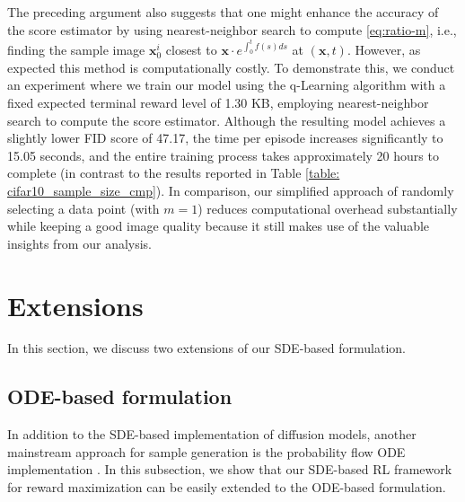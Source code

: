 \documentclass[11pt]{article}
\begin{document}
 The preceding argument also suggests that one might enhance the accuracy of the score estimator  by using nearest-neighbor search to compute \eqref{eq:ratio-m}, i.e., finding the sample image $\mathbf{x}^i_{0}$ closest to $\mathbf{x} \cdot e^{\int_{0}^{t} f(s)ds}$ at $(\mathbf{x}, t)$. However, as expected this method is computationally costly. To demonstrate this, we conduct an experiment where we train our model using the q-Learning algorithm with a fixed expected terminal reward level of 1.30 KB, employing nearest-neighbor search to compute the score estimator. Although the resulting model achieves a slightly lower FID score of 47.17, the time per episode increases significantly to 15.05 seconds, and the entire training process takes approximately 20 hours to complete (in contrast to the results reported in Table \ref{table: cifar10_sample_size_cmp}). In comparison, our simplified approach of randomly selecting a data point (with $m=1$) reduces computational overhead substantially while keeping a good image quality because it still makes use of the valuable insights from our analysis.








\section{Extensions}\label{sec:ext}

In this section, we discuss two extensions of our SDE-based formulation.

\subsection{ODE-based formulation}\label{sec:ode}
In addition to the SDE-based implementation of diffusion models, another mainstream approach for sample generation is the probability flow ODE implementation \citep{SongICLR2021}.
In this subsection, we show that our SDE-based RL framework for reward maximization can be easily extended to the ODE-based formulation.
\end{document}
